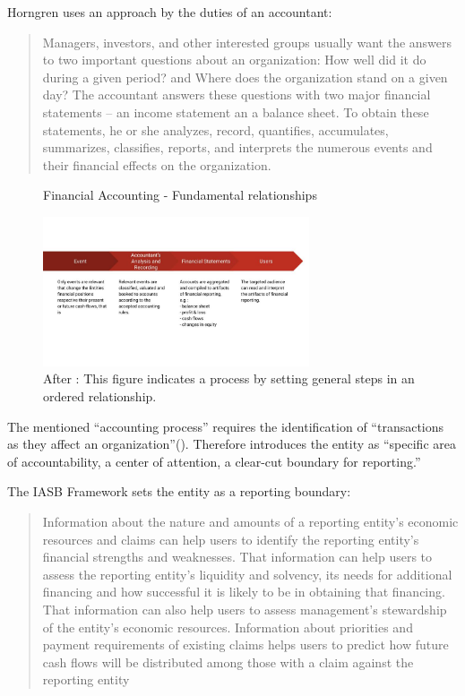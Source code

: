 Horngren uses an approach by the duties of an accountant\cite[p.3]{Horngren1984}:
\blockquote{Managers, investors, and other interested groups usually want the answers to two important questions about an organization: How well did it do during a given period?
and Where does the organization stand on a given day? The accountant answers these questions with two major financial statements -- an income statement an a balance sheet.
To obtain these statements, he or she analyzes, record, quantifies, accumulates, summarizes, classifies, reports, and interprets the numerous events and their financial effects on the organization.}


\begin{figure}
	\centering
	\caption{Financial Accounting - Fundamental relationships}
	\label{fig:accounting-fundamental-process}
	\includegraphics[width=0.7\textwidth]{../figures/Financial Accounting - fundamental relationships}
	\caption*{After \cite[p.3]{Horngren1984}: This figure indicates a process by setting general steps in an ordered relationship.} 
\end{figure}

The mentioned \enquote{accounting process} requires the identification of \enquote{transactions as they affect an organization}(\cite[p.13]{Horngren1984}).
Therefore \cite[p.13]{Horngren1984} introduces the entity as \enquote{specific area of accountability, a center of attention, a clear-cut boundary for reporting.}

The IASB Framework sets the entity as a reporting boundary:\cite[1.13]{IASBFramwork}

\blockquote{Information about the nature and amounts of a reporting entity’s economic resources and claims can help users to identify the reporting entity’s financial strengths and weaknesses. That information can help users to assess the reporting entity’s liquidity and solvency, its needs for additional financing and how successful it is likely to be in obtaining that financing. That information can also help users to assess management’s stewardship of the entity’s economic resources. Information about priorities and payment requirements of existing claims helps users to predict how future cash flows will be distributed among those with a claim against the reporting entity}

